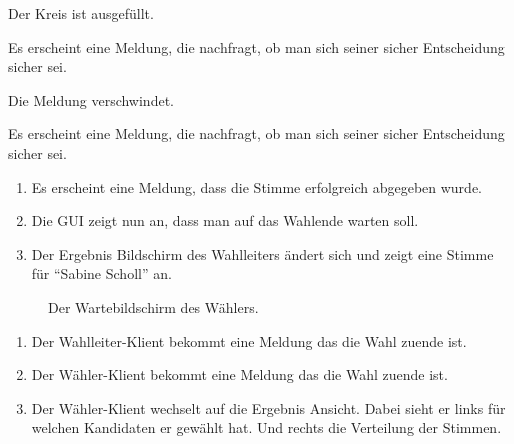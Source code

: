\documentclass[parskip=full]{scrartcl}
\begin{document}
		{Der Kreis ist ausgefüllt.}
	
		{Es erscheint eine Meldung, die nachfragt, ob man sich seiner sicher Entscheidung sicher sei.}

		{Die Meldung verschwindet.}
			
		{Es erscheint eine Meldung, die nachfragt, ob man sich seiner sicher Entscheidung sicher sei.}

		{\begin{enumerate}
			\item Es erscheint eine Meldung, dass die Stimme erfolgreich abgegeben wurde.
			\item Die GUI zeigt nun an, dass man auf das Wahlende warten soll.
			\item Der Ergebnis Bildschirm des Wahlleiters ändert sich und zeigt eine Stimme für \enquote{Sabine Scholl} an.
		\end{enumerate}}
	
\begin{figure}[h!]
	\caption{\label{fig:vot_voted}
		Der Wartebildschirm des Wählers.
	}
\end{figure}


		{\begin{enumerate}
			\item Der Wahlleiter-Klient bekommt eine Meldung das die Wahl zuende ist.
			\item Der Wähler-Klient bekommt eine Meldung das die Wahl zuende ist.
			\item Der Wähler-Klient wechselt auf die Ergebnis Ansicht. Dabei sieht er links für welchen Kandidaten er gewählt hat. Und rechts die Verteilung der Stimmen.
		\end{enumerate}}
\end{document}
